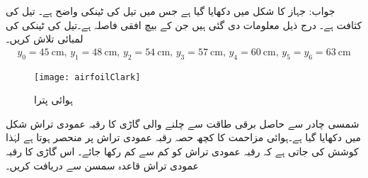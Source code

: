 جواب:\quad {}
جہاز کا  شکل  میں دکھایا گیا ہے جس میں  تیل کی ٹینکی واضح ہے۔ تیل کی کثافت  ہے۔ درج ذیل معلومات دی گئی ہیں جن کے بیچ افقی فاصلہ  ہے۔تیل کی ٹینکی کی لمبائی تلاش کریں۔
\begin{align*}
y_0=\SI{45}{\centi\meter},\,y_1=\SI{48}{\centi\meter},\,y_2=\SI{54}{\centi\meter},\,y_3=\SI{57}{\centi\meter},\,y_4=\SI{60}{\centi\meter},\,y_5=y_6=\SI{63}{\centi\meter}
\end{align*}
\begin{figure}
\centering
\texttt{[image: airfoilClark]}
\caption{ہوائی پترا}
\label{شکل_سوال_تکمل_ہوائی_پر}
\end{figure}

شمسی چادر سے حاصل برقی طاقت سے چلنے والی گاڑی کا رقبہ عمودی تراش شکل  میں دکھایا گیا ہے۔ہوائی مزاحمت کا کچھ حصہ رقبہ عمودی تراش پر منحصر ہوتا ہے لہٰذا کوشش کی جاتی ہے کہ رقبہ عمودی تراش کو کم سے کم رکھا جائے۔ اس گاڑی کا رقبہ عمودی تراش قاعدہ سمسن سے دریافت کریں۔ 

